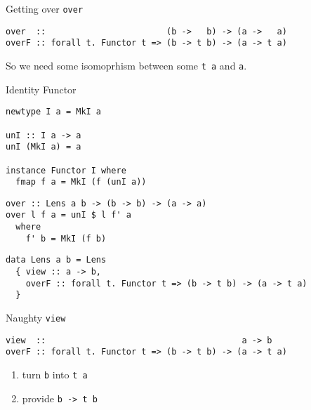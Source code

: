 \documentclass[presentation,aspectratio=169,8pt]{beamer}
\begin{document}
\begin{frame}[label={sec:org724ab60},fragile]{Getting over \texttt{over}}
 \begin{verbatim}
over  ::                        (b ->   b) -> (a ->   a)
overF :: forall t. Functor t => (b -> t b) -> (a -> t a)
\end{verbatim}

\pause

So we need some isomoprhism between some \texttt{t a} and \texttt{a}.
\end{frame}

\begin{frame}[label={sec:org2ac0fdb},fragile]{Identity Functor}
 \begin{verbatim}
newtype I a = MkI a

unI :: I a -> a
unI (MkI a) = a

instance Functor I where
  fmap f a = MkI (f (unI a))
\end{verbatim}

\pause

\begin{verbatim}
over :: Lens a b -> (b -> b) -> (a -> a)
over l f a = unI $ l f' a
  where
    f' b = MkI (f b)
\end{verbatim}

\pause

\begin{verbatim}
data Lens a b = Lens
  { view :: a -> b,
    overF :: forall t. Functor t => (b -> t b) -> (a -> t a)
  }
\end{verbatim}
\end{frame}

\begin{frame}[label={sec:orged7a48d},fragile]{Naughty \texttt{view}}
 \begin{verbatim}
view  ::                                       a -> b
overF :: forall t. Functor t => (b -> t b) -> (a -> t a)
\end{verbatim}

\pause

\begin{enumerate}
\item turn \texttt{b} into \texttt{t a}
\item provide \texttt{b -> t b}
\end{enumerate}
\end{frame}
\end{document}
